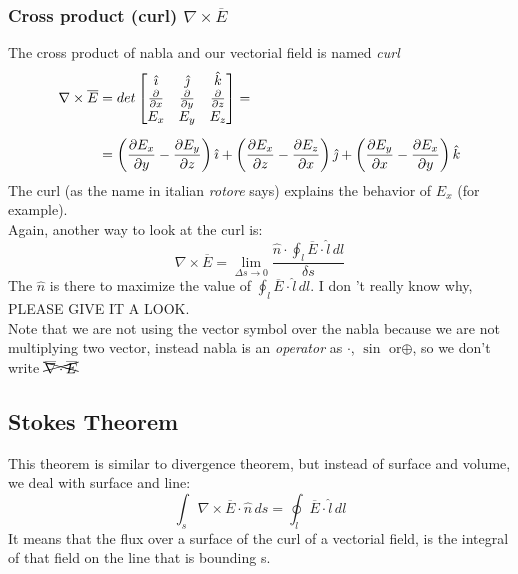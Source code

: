\subsubsection*{Cross product (curl) $\nabla \times \overline{E}$}
The cross product of nabla and our vectorial field is named \emph{curl}
\begin{align}
    \begin{split}
        \nabla\times \overline{E}&=det
        \left[ \begin{matrix}
        \hat{\imath} & \hat{\jmath} & \hat{\mathnormal{k}}\\
        \frac{\partial}{\partial x} & \frac{\partial}{\partial y} & \frac{\partial}{\partial z}\\
        E_x & E_y & E_z
        \end{matrix}\right]=\\[5pt]
        &=\left(\frac{\partial E_x}{\partial y} - \frac{\partial E_y}{\partial z}\right)\hat{\imath}+
        \left(\frac{\partial E_x}{\partial z} - \frac{\partial E_z}{\partial x}\right)\hat{\jmath}+
        \left(\frac{\partial E_y}{\partial x} - \frac{\partial E_x}{\partial y}\right)\hat{\mathnormal{k}}
    \end{split}
\end{align}
The curl (as the name in italian \emph{rotore} says) explains the behavior of $E_x$ (for example).\\
Again, another way to look at the curl is:
\begin{equation}
\nabla \times \overline{E}=\lim_{\Delta s \rightarrow 0}\frac{\hat{n}\cdot\oint_l \overline{E}\cdot \hat{l}\,dl}{\delta s}
\end{equation}
The $\hat{n}$ is there to maximize the value of $\oint_l \overline{E}\cdot \hat{l}\,dl$. I don
't really know why, PLEASE GIVE IT A LOOK.\\
Note that we are not using the vector symbol over the nabla because we are not multiplying two vector, instead nabla is an \emph{operator} as $\cdot$, $\sin$ or$\oplus$, so we don't write $\xcancel{\overline{\nabla}\cdot\overline{E}}$
\subsection*{Stokes Theorem}
This theorem is similar to divergence theorem, but instead of surface and volume, we deal with surface and line:
\begin{equation}\label{eq:stokes_eq}
\int_s \nabla\times \overline{E}\cdot \hat{n}\,ds=\oint_l\overline{E}\cdot\hat{l}\,dl
\end{equation}
It means that the flux over a surface of the curl of a vectorial field, is the integral of that field on the line that is bounding s.
